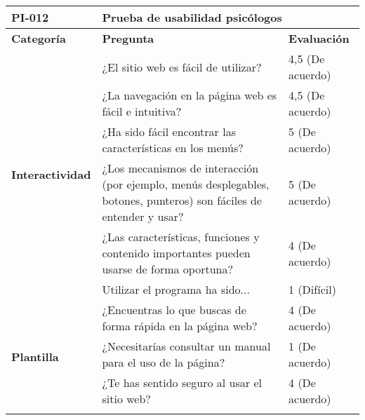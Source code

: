 \begin{table}[htpb]
\centering
\begin{tabularx}{\textwidth}{|l|X|l|}
\hline
\rowcolor[gray]{0.9}\textbf{PI-012}                           & \multicolumn{2}{l|}{\textbf{Prueba de usabilidad psicólogos}}                                                                             \\ \hline
\textbf{Categoría}                        & \textbf{Pregunta}                                                                                                   & \textbf{Evaluación} \\ \hline
\multirow{6}{*}{\textbf{Interactividad}}  & ¿El sitio web es fácil de utilizar?                                                                                 & 4,5 (De acuerdo)    \\ \cline{2-3} 
                                          & ¿La navegación en la página web es fácil e intuitiva?                                                               & 4,5 (De acuerdo)    \\ \cline{2-3} 
                                          & ¿Ha sido fácil encontrar las características en los menús?                                                          & 5 (De acuerdo)      \\ \cline{2-3} 
                                          & ¿Los mecanismos de interacción (por ejemplo, menús desplegables, botones, punteros) son fáciles de entender y usar? & 5 (De acuerdo)      \\ \cline{2-3} 
                                          & ¿Las características, funciones y contenido importantes pueden usarse de forma oportuna?                            & 4 (De acuerdo)      \\ \cline{2-3} 
                                          & Utilizar el programa ha sido...                                                                                     & 1 (Difícil)         \\ \hline
\multirow{4}{*}{\textbf{Plantilla}}       & ¿Encuentras lo que buscas de forma rápida en la página web?                                                         & 4 (De acuerdo)      \\ \cline{2-3} 
                                          & ¿Necesitarías consultar un manual para el uso de la página?                                                         & 1 (De acuerdo)      \\ \cline{2-3} 
                                          & ¿Te has sentido seguro al usar el sitio web?                                                                        & 4 (De acuerdo)      \\ \cline{2-3} 

\end{tabularx}
\end{table}
